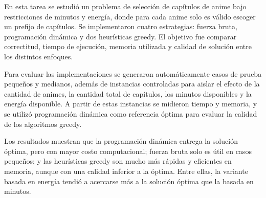 
En esta tarea se estudió un problema de selección de capítulos de anime bajo restricciones de minutos y energía, donde para cada anime solo es válido escoger un prefijo de capítulos. Se implementaron cuatro estrategias: fuerza bruta, programación dinámica y dos heurísticas greedy. El objetivo fue comparar correctitud, tiempo de ejecución, memoria utilizada y calidad de solución entre los distintos enfoques.

Para evaluar las implementaciones se generaron automáticamente casos de prueba pequeños y medianos, además de instancias controladas para aislar el efecto de la cantidad de animes, la cantidad total de capítulos, los minutos disponibles y la energía disponible. A partir de estas instancias se midieron tiempo y memoria, y se utilizó programación dinámica como referencia óptima para evaluar la calidad de los algoritmos greedy.

Los resultados muestran que la programación dinámica entrega la solución óptima, pero con mayor costo computacional; fuerza bruta solo es útil en casos pequeños; y las heurísticas greedy son mucho más rápidas y eficientes en memoria, aunque con una calidad inferior a la óptima. Entre ellas, la variante basada en energía tendió a acercarse más a la solución óptima que la basada en minutos.
